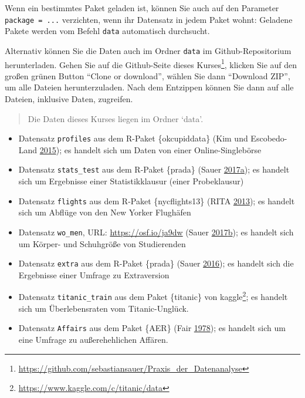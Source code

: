 \documentclass[12pt,ngerman,]{book}
\providecommand{\tightlist}{%
  \setlength{\itemsep}{0pt}\setlength{\parskip}{0pt}}
\let\rmarkdownfootnote\footnote%
\def\footnote{\protect\rmarkdownfootnote}
\renewcommand{\href}[2]{#2\footnote{\url{#1}}}
\theoremstyle{definition}
\theoremstyle{definition}
\theoremstyle{remark}
\begin{document}
Wenn ein bestimmtes Paket geladen ist, können Sie auch auf den Parameter
\texttt{package\ =\ ...} verzichten, wenn ihr Datensatz in jedem Paket
wohnt: Geladene Pakete werden vom Befehl \texttt{data} automatisch
durchsucht.

Alternativ können Sie die Daten auch im Ordner \texttt{data} im
Github-Repositorium herunterladen. Gehen Sie auf die Github-Seite dieses
Kurses\footnote{\url{https://github.com/sebastiansauer/Praxis_der_Datenanalyse}},
klicken Sie auf den großen grünen Button ``Clone or download'', wählen
Sie dann ``Download ZIP'', um alle Dateien herunterzuladen. Nach dem
Entzippen können Sie dann auf alle Dateien, inklusive Daten, zugreifen.

\begin{quote}
Die Daten dieses Kurses liegen im Ordner `data'.
\end{quote}

\begin{itemize}
\tightlist
\item
  Datensatz \texttt{profiles} aus dem R-Paket \{okcupiddata\} (Kim und
  Escobedo-Land \protect\hyperlink{ref-kim2015okcupid}{2015}); es
  handelt sich um Daten von einer Online-Singlebörse
\item
  Datensatz \texttt{stats\_test} aus dem R-Paket \{prada\} (Sauer
  \protect\hyperlink{ref-Sauer_2017}{2017}\protect\hyperlink{ref-Sauer_2017}{a});
  es handelt sich um Ergebnisse einer Statistikklausur (einer
  Probeklausur)
\item
  Datensatz \texttt{flights} aus dem R-Paket \{nycflights13\} (RITA
  \protect\hyperlink{ref-nycflights13}{2013}); es handelt sich um
  Abflüge von den New Yorker Flughäfen
\item
  Datensatz \texttt{wo\_men}, URL: \url{https://osf.io/ja9dw} (Sauer
  \protect\hyperlink{ref-Sauer_2017a}{2017}\protect\hyperlink{ref-Sauer_2017a}{b});
  es handelt sich um Körper- und Schuhgröße von Studierenden
\item
  Datensatz \texttt{extra} aus dem R-Paket \{prada\} (Sauer
  \protect\hyperlink{ref-Sauer_2016}{2016}); es handelt sich die
  Ergebnisse einer Umfrage zu Extraversion
\item
  Datensatz \texttt{titanic\_train} aus dem Paket \{titanic\} von
  \href{https://www.kaggle.com/c/titanic/data}{kaggle}; es handelt sich
  um Überlebensraten vom Titanic-Unglück.
\item
  Datensatz \texttt{Affairs} aus dem Paket \{AER\} (Fair
  \protect\hyperlink{ref-fair1978theory}{1978}); es handelt sich um eine
  Umfrage zu außerehehlichen Affären.
\end{itemize}
\end{document}

